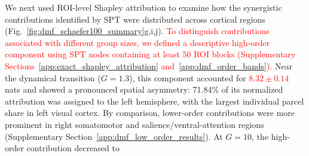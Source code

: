 \documentclass[fleqn,10pt]{wlscirep}
\newcommand{\rev}[1]{\textcolor{red}{#1}}
\theoremstyle{naturetheorem}
\begin{document}
We next used ROI-level Shapley attribution to examine how the synergistic contributions identified by SPT were distributed across cortical regions (Fig.~\ref{fig:dmf_schaefer100_summary}g,i,j). %
\rev{To distinguish contributions associated with %
\rev{different group sizes}, we defined a descriptive high-order component using SPT nodes containing at least 50 ROI blocks (Supplementary Sections~\ref{app:exact_shapley_attribution} and~\ref{app:dmf_order_bands}).} Near the dynamical transition ($G=1.3$), this component accounted for %
\rev{$8.32\pm0.14$} nats and showed a pronounced spatial asymmetry: 71.84\% of its normalized attribution was assigned to the left hemisphere, with the largest individual parcel share in left visual cortex. By comparison, lower-order contributions were more prominent in right somatomotor and salience/ventral-attention regions (Supplementary Section~\ref{app:dmf_low_order_results}). At $G=10$, the high-order contribution decreased to %
\end{document}
